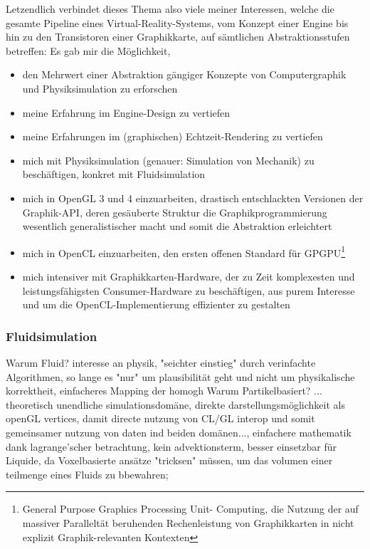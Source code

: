 Letzendlich verbindet dieses Thema also viele meiner Interessen, welche die gesamte Pipeline eines Virtual-Reality-Systems,  vom Konzept einer Engine bis hin zu den Transistoren einer Graphikkarte, auf sämtlichen Abstraktionsstufen betreffen: Es gab mir die Möglichkeit,
\begin{itemize}
	\item den Mehrwert einer Abstraktion gängiger Konzepte von Computergraphik und Physiksimulation zu erforschen
	\item meine Erfahrung im Engine-Design zu vertiefen
	\item meine Erfahrungen im (graphischen) Echtzeit-Rendering zu vertiefen
	\item mich mit Physiksimulation (genauer: Simulation von Mechanik) zu beschäftigen, konkret mit Fluidsimulation
	
	\item mich in OpenGL 3 und 4 einzuarbeiten, drastisch entschlackten Versionen der Graphik-API, deren gesäuberte Struktur die Graphikprogrammierung wesentlich generalistischer macht und somit die Abstraktion erleichtert
	\item mich in OpenCL einzuarbeiten, den ersten offenen Standard für \linebreak GPGPU\footnote{General Purpose Graphics Processing Unit- Computing, die Nutzung der auf massiver Paralleltät beruhenden Rechenleistung von Graphikkarten in nicht explizit Graphik-relevanten Kontexten}
	\item  mich intensiver mit Graphikkarten-Hardware, der zu Zeit komplexesten und leistungsfähigsten Consumer-Hardware zu beschäftigen, aus purem Interesse und um die OpenCL-Implementierung effizienter zu gestalten

\end{itemize}

\subsubsection{Fluidsimulation}
Warum Fluid?
 interesse an physik, "seichter einstieg" durch verinfachte Algorithmen, so lange es "nur" um plausibilität geht und nicht um physikalische korrektheit, einfacheres Mapping der homogh
Warum Partikelbasiert?
... theoretisch unendliche simulationsdomäne, direkte darstellungsmöglichkeit als openGL vertices, damit directe nutzung von CL/GL interop und somit gemeinsamer nutzung von daten ind beiden domänen..., einfachere mathematik dank lagrange'scher betrachtung, kein advektionsterm, besser einsetzbar für Liquide, da Voxelbasierte ansätze "tricksen" müssen, um das volumen einer teilmenge eines Fluids zu bbewahren;

\clearpage
